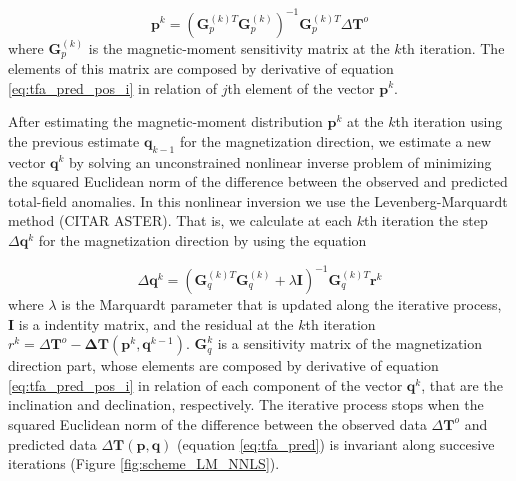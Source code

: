 \begin{equation}
	\mathbf{p}^k = \left(\mathbf{G}_{p}^{(k)T} \mathbf{G}_{p}^{(k)}\right)^{-1} \mathbf{G}_{p}^{(k)T}  \Delta \mathbf{T}^o
	\label{eq:linsys_p}
\end{equation}
where $\mathbf{G}_p^{(k)}$ is the magnetic-moment sensitivity matrix at the $k$th iteration. The elements of this matrix are composed by derivative of equation \ref{eq:tfa_pred_pos_i} in relation of $j$th element of the vector $\mathbf{p}^k$.

After estimating the magnetic-moment distribution $\mathbf{p}^k$ at the $k$th iteration using the previous estimate $\mathbf{q}_{k-1}$ for the magnetization direction, we estimate a new vector $\mathbf{q}^{k}$ by solving an unconstrained nonlinear inverse problem of minimizing the squared Euclidean norm of the difference between the observed and predicted total-field anomalies. In this nonlinear inversion we use the Levenberg-Marquardt method (CITAR ASTER). That is, we calculate at each $k$th iteration the step $\Delta \mathbf{q}^k$ for the magnetization direction by using the equation

\begin{equation}
	\Delta \mathbf{q}^k = (\mathbf{G}_{q}^{(k)T} \mathbf{G}_{q}^{(k)} + \lambda \mathbf{I})^{-1} \mathbf{G}_{q}^{(k)T}  \mathbf{r}^k
	\label{eq:linsys_q}
\end{equation}
where $\lambda$ is the Marquardt parameter that is updated along the iterative process, $\mathbf{I}$ is a indentity matrix, and  the residual at the $k$th iteration $r^k = \Delta \mathbf{T}^o - \mathbf{\Delta T} (\mathbf{p}^k, \mathbf{q}^{k-1})$. $\mathbf{G}_q^k$ is a sensitivity matrix of the magnetization direction part, whose elements are composed by derivative of equation \ref{eq:tfa_pred_pos_i} in relation of each component of the vector $\mathbf{q}^k$, that are the inclination and declination, respectively. The iterative process stops when the squared Euclidean norm of the difference between the observed data $\Delta \mathbf{T}^{o}$ and predicted data $\Delta\mathbf{T}(\mathbf{p}, \mathbf{q})$ (equation \ref{eq:tfa_pred}) is invariant along succesive iterations (Figure \ref{fig:scheme_LM_NNLS}).



